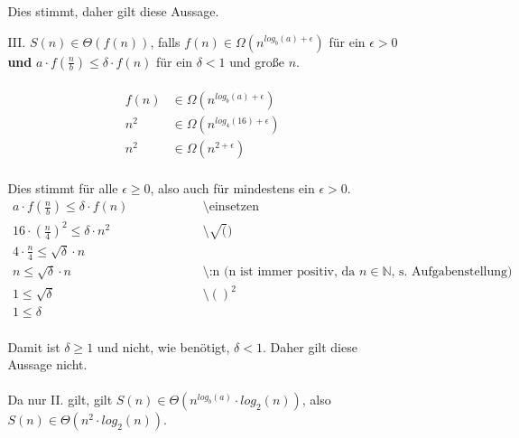 \documentclass{article}
\begin{document}
\begin{enumerate}
\begin{enumerate}
\begin{enumerate}
    	    Dies stimmt, daher gilt diese Aussage.
    	    \item[III.]
    	    $S(n) \in \Theta (f(n))$, falls $f(n) \in \Omega (n^{log_b(a)+ \epsilon})$ für ein $\epsilon > 0$ \textbf{und} $a \cdot f(\frac{n}{b}) \leq \delta \cdot f(n)$ für ein $\delta < 1$ und große $n$.\\
    	    \\
    	    \[
    	        \begin{array}{ll}
    	            f(n) &\in \Omega (n^{log_b(a)+ \epsilon})\\
    	            n^2 &\in \Omega (n^{log_4(16)+ \epsilon})\\
    	            n^2 &\in \Omega (n^{2+ \epsilon})
    	        \end{array}
    	    \]
    	    \\
    	    Dies stimmt für alle $\epsilon \geq 0$, also auch für mindestens ein $\epsilon > 0$.
    	    \[
    	        \begin{array}{lll}
    	            a \cdot f(\frac{n}{b}) \leq \delta \cdot f(n)~~~~~~~~~~~~~~~~~~~~~~~&\text{\textbackslash einsetzen}\\
    	            16 \cdot (\frac{n}{4})^2 \leq \delta \cdot n^2 &\text{\textbackslash $\sqrt()$}\\
    	            4 \cdot \frac{n}{4} \leq \sqrt{\delta} \cdot n\\
    	            n \leq \sqrt{\delta} \cdot n &\text{\textbackslash :n    (n ist immer positiv, da $n \in \mathbb{N}$, s. Aufgabenstellung)}\\
    	            1 \leq \sqrt{\delta} &\text{\textbackslash $()^2$}\\
    	            1 \leq \delta
    	        \end{array}
    	    \]
    	    \\
    	    Damit ist $\delta \geq 1$ und nicht, wie benötigt, $\delta < 1$. Daher gilt diese Aussage nicht.
    	    \\\\
    	    Da nur II. gilt, gilt $S(n) \in \Theta (n^{log_b(a)} \cdot log_2(n))$, also $S(n) \in \Theta (n^2 \cdot log_2(n))$.
    	\end{enumerate}
    \end{enumerate}
\end{enumerate}
\end{document}
